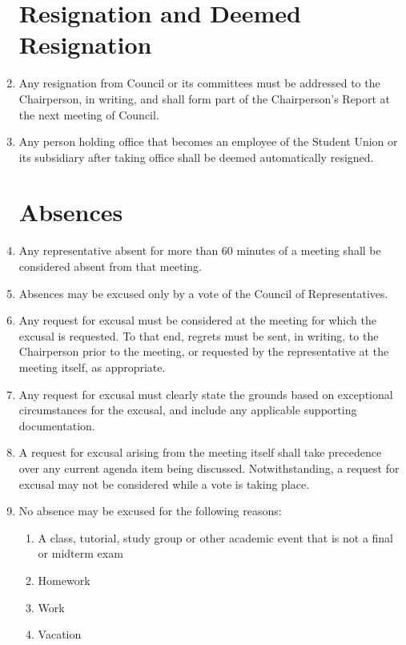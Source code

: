 \documentclass[oneside]{book}
\begin{document}
\begin{enumerate}
\chapter{\label{Resignation_and_Deemed_Resignation}Resignation and Deemed
Resignation}
\item Any resignation from Council or its committees must be addressed to
the Chairperson, in writing, and shall form part of the Chairperson's
Report at the next meeting of Council. 
\item Any person holding office that becomes an employee of the Student
Union or its subsidiary after taking office shall be deemed automatically
resigned.

\chapter{\label{Absences}Absences}
\item Any representative absent for more than 60 minutes of a meeting shall be considered absent from that meeting.
\item Absences may be excused only by a vote of the Council of Representatives.
\item  Any request for excusal must be considered at the meeting for which the excusal is requested. 
To that end, regrets must be sent, in writing, to the Chairperson prior to the meeting, 
or requested by the representative at the meeting itself, as appropriate.
\item Any request for excusal must clearly state the grounds based on exceptional circumstances for the excusal, and include any applicable supporting documentation. 
\item A request for excusal arising from the meeting itself shall take precedence over any current agenda item being discussed. Notwithstanding, a request for excusal may not be considered while a vote is taking place. 
\item No absence may be excused for the following reasons:

\begin{enumerate}
\item A class, tutorial, study group or other academic event that is not a final or midterm exam
\item Homework 
\item Work 
\item Vacation 
\end{enumerate}


\end{enumerate}
\end{document}
